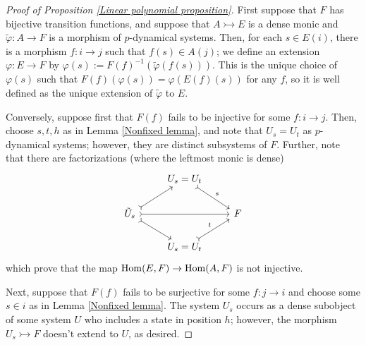 \documentclass{amsart}
\begin{document}
\begin{proof}[Proof of Proposition \ref{Linear polynomial proposition}]
  First suppose that $F$ has bijective transition functions, and suppose that $A \rightarrowtail E$ is a dense monic and $\tilde \varphi:A \rightarrow F$ is a morphism of $p$-dynamical systems.
  Then, for each $s \in E(i)$, there is a morphism $f:i \rightarrow j$ such that $f(s) \in A(j)$;
  we define an extension $\varphi:E \rightarrow F$ by $\varphi(s) := F(f)^{-1}(\tilde \varphi(f(s)))$.
  This is the unique choice of $\varphi(s)$ such that $F(f)(\varphi(s)) = \varphi(E(f)(s))$ for any $f$, so it is well defined as the unique extension of $\tilde \varphi$ to $E$.

  Conversely, suppose first that $F(f)$ fails to be injective for some $f:i \rightarrow j$.
  Then, choose $s,t,h$ as in Lemma \ref{Nonfixed lemma}, and note that $U_s = U_t$ as $p$-dynamical systems;
  however, they are distinct subsystems of $F$.
  Further, note that there are factorizations (where the leftmost monic is dense)
  \[
    \begin{tikzcd}
      & U_s = U_t \arrow[dr,tail,"s"]\\
      \tilde U_s \arrow[ru, tail] \arrow[rd, tail] \arrow[rr,tail]
      & & F\\
      & U_s = U_t \arrow[ur, tail, "t"]
    \end{tikzcd}
  \]
  which prove that the map $\operatorname{Hom}(E,F) \rightarrow \operatorname{Hom}(A,F)$ is not injective.

  Next, suppose that $F(f)$ fails to be surjective for some $f:j \rightarrow i$ and choose some $s \in i$ as in Lemma \ref{Nonfixed lemma}.
  The system $U_s$ occurs as a dense subobject of some system $U$ who includes a state in position $h$;
  however, the morphism $U_s \rightarrowtail F$ doesn't extend to $U$, as desired.
\end{proof}
\end{document}
